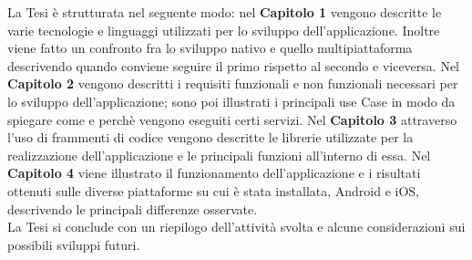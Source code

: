 La Tesi \`e strutturata nel seguente modo:
nel \textbf{Capitolo 1} vengono descritte le varie tecnologie e linguaggi utilizzati per lo sviluppo dell'applicazione. Inoltre viene fatto un confronto fra lo sviluppo nativo e quello multipiattaforma descrivendo quando conviene seguire il primo rispetto al secondo e viceversa.
Nel \textbf{Capitolo 2}  vengono descritti i requisiti funzionali e non funzionali necessari per lo sviluppo dell'applicazione; sono poi illustrati i principali use Case in modo da spiegare come e perch\`e vengono eseguiti certi servizi.
Nel \textbf{Capitolo 3}  attraverso l'uso di frammenti di codice vengono descritte le librerie utilizzate per la realizzazione dell'applicazione e le principali funzioni all'interno di essa.
Nel \textbf{Capitolo 4}  viene illustrato il funzionamento dell'applicazione e i risultati ottenuti sulle diverse piattaforme su cui \`e stata installata, Android e iOS, descrivendo le principali differenze osservate.\\
La Tesi si conclude con un riepilogo dell'attivit\`a svolta e alcune considerazioni sui possibili sviluppi futuri.
